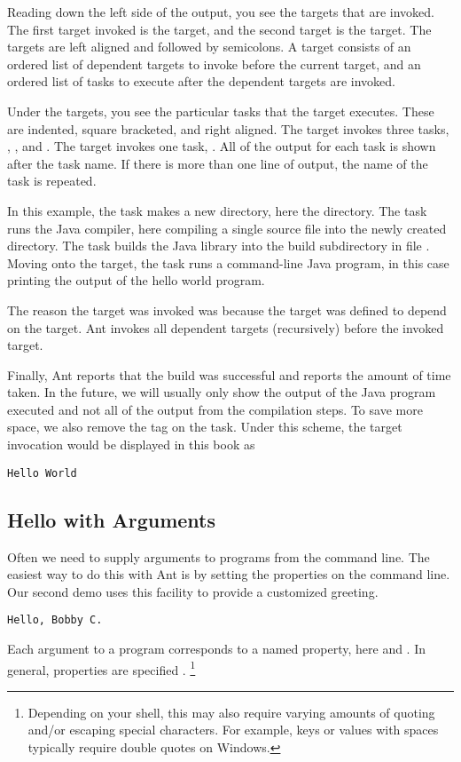 Reading down the left side of the output, you see the targets that are
invoked.  The first target invoked is the  target, and the
second target is the  target.  The targets are left aligned
and followed by semicolons.  A target consists of an ordered list of
dependent targets to invoke before the current target, and an ordered
list of tasks to execute after the dependent targets are invoked.

Under the targets, you see the particular tasks that the target
executes.  These are indented, square bracketed, and right aligned.
The  target invokes three tasks, , ,
and .  The  target invokes one task, .
All of the output for each task is shown after the task name.  If
there is more than one line of output, the name of the task is
repeated.

In this example, the  task makes a new directory, here the 
 directory.  The  task runs the
Java compiler, here compiling a single source file into the
newly created directory.  The  task builds the Java
library into the build subdirectory  in file
.  Moving onto the  target,
the  task runs a command-line Java program, in this
case printing the output of the hello world program.

The reason the  target was invoked was because the
 target was defined to depend on the  target.
Ant invokes all dependent targets (recursively) before the invoked
target.

Finally, Ant reports that the build was successful and reports the
amount of time taken.  In the future, we will usually only show the
output of the Java program executed and not all of the output from the
compilation steps.  To save more space, we also remove the
\code{[java]} tag on the task.  Under this scheme, the 
target invocation would be displayed in this book as
%
\begin{verbatim}
Hello World
\end{verbatim}

\subsection{Hello with Arguments}

Often we need to supply arguments to programs from the command
line.  The easiest way to do this with Ant is by setting the
properties on the command line.  Our second demo uses this facility
to provide a customized greeting.
%
\begin{verbatim} 
Hello, Bobby C.
\end{verbatim}
%
Each argument to a program corresponds to a named property, here
 and .  In general, properties are specified
.%
%
\footnote{Depending on your shell, this may also require varying
  amounts of quoting and/or escaping special characters.  For example,
  keys or values with spaces typically require double quotes on
  Windows.}


